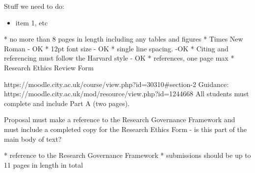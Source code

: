 

Stuff we need to do:
\begin{itemize}
    \item item 1, etc
\end{itemize}

* no more than 8 pages in length including any tables and figures 
* Times New Roman - OK
* 12pt font size  - OK
* single line spacing. -OK
* Citing and referencing must follow the Harvard style - OK
* references, one page max
* Research Ethics Review Form 

https://moodle.city.ac.uk/course/view.php?id=30310#section-2
Guidance:
https://moodle.city.ac.uk/mod/resource/view.php?id=1244668
All students must complete and include Part A (two pages).

Proposal must make a reference to the Research Governance Framework and must include a completed copy for the Research Ethics Form - is this part of the main body of text?

* reference to the Research Governance Framework
* submissions should be up to 11 pages in length in total
